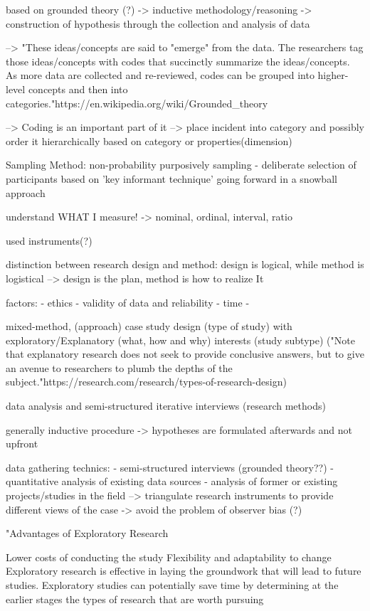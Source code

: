 based on grounded theory (?) -> inductive methodology/reasoning -> construction of hypothesis through the collection and analysis of data


--> "These ideas/concepts are said to "emerge" from the data. The researchers tag those ideas/concepts with codes that succinctly summarize the ideas/concepts. As more data are collected and re-reviewed, codes can be grouped into higher-level concepts and then into categories."https://en.wikipedia.org/wiki/Grounded_theory

--> Coding is an important part of it --> place incident into category and possibly order it hierarchically based on category or properties(dimension)

Sampling Method:
non-probability purposively sampling - deliberate selection of participants based on 'key informant technique' going forward in a snowball approach

understand WHAT I measure!
-> nominal, ordinal, interval, ratio

used instruments(?)


distinction between research design and method:
design is logical, while method is logistical
--> design is the plan, method is how to realize It

factors:
- ethics
- validity of data and reliability
- time
- 

mixed-method, (approach)
case study design (type of study) with 
exploratory/Explanatory (what, how and why) interests (study subtype) ("Note that explanatory research does not seek to provide conclusive answers, but to give an avenue to researchers to plumb the depths of the subject."https://research.com/research/types-of-research-design)

data analysis and semi-structured iterative interviews (research methods)


generally inductive procedure -> hypotheses are formulated afterwards and not upfront

data gathering technics:
- semi-structured interviews (grounded theory??)
- quantitative analysis of existing data sources
- analysis of former or existing projects/studies in the field
--> triangulate research instruments to provide different views of the case -> avoid the problem of observer bias (?)

"Advantages of Exploratory Research

    Lower costs of conducting the study
    Flexibility and adaptability to change
    Exploratory research is effective in laying the groundwork that will lead to future studies.
    Exploratory studies can potentially save time by determining at the earlier stages the types of research that are worth pursuing

